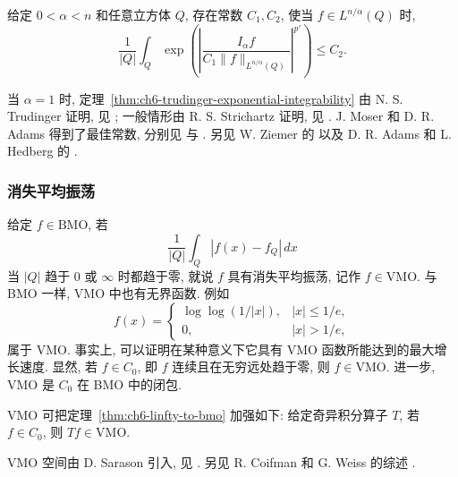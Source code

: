 \begin{Theorem}
\label{thm:ch6-trudinger-exponential-integrability}
给定 $0<\alpha<n$ 和任意立方体 $Q$, 存在常数 $C_1,C_2$, 使当 $f\in L^{n/\alpha}(Q)$ 时,
\[
 \frac1{|Q|}\int_Q
 \exp\left(\left|\frac{I_\alpha f}{C_1\|f\|_{L^{n/\alpha}(Q)}}\right|^{p'}\right)
 \le C_2.
\]
\end{Theorem}

当 $\alpha=1$ 时, 定理~\ref{thm:ch6-trudinger-exponential-integrability} 由 N. S. Trudinger 证明, 见 ; 一般情形由 R. S. Strichartz 证明, 见 . J. Moser 和 D. R. Adams 得到了最佳常数, 分别见  与 . 另见 W. Ziemer 的  以及 D. R. Adams 和 L. Hedberg 的 .

\hypertarget{chapter-06-page-143}{}
\subsubsection{消失平均振荡}
\label{subsec:ch6-vmo}

给定 $f\in\mathrm{BMO}$, 若
\[
 \frac1{|Q|}\int_Q|f(x)-f_Q|\,dx
\]
当 $|Q|$ 趋于 $0$ 或 $\infty$ 时都趋于零, 就说 $f$ 具有消失平均振荡, 记作 $f\in\mathrm{VMO}$. 与 BMO 一样, VMO 中也有无界函数. 例如
\[
 f(x)=
 \begin{cases}
  \log\log(1/|x|),&|x|\le1/e,\\
  0,&|x|>1/e,
 \end{cases}
\]
属于 VMO. 事实上, 可以证明在某种意义下它具有 VMO 函数所能达到的最大增长速度. 显然, 若 $f\in C_0$, 即 $f$ 连续且在无穷远处趋于零, 则 $f\in\mathrm{VMO}$. 进一步, VMO 是 $C_0$ 在 BMO 中的闭包.

VMO 可把定理~\ref{thm:ch6-linfty-to-bmo} 加强如下: 给定奇异积分算子 $T$, 若 $f\in C_0$, 则 $Tf\in\mathrm{VMO}$.

VMO 空间由 D. Sarason 引入, 见 . 另见 R. Coifman 和 G. Weiss 的综述 .

